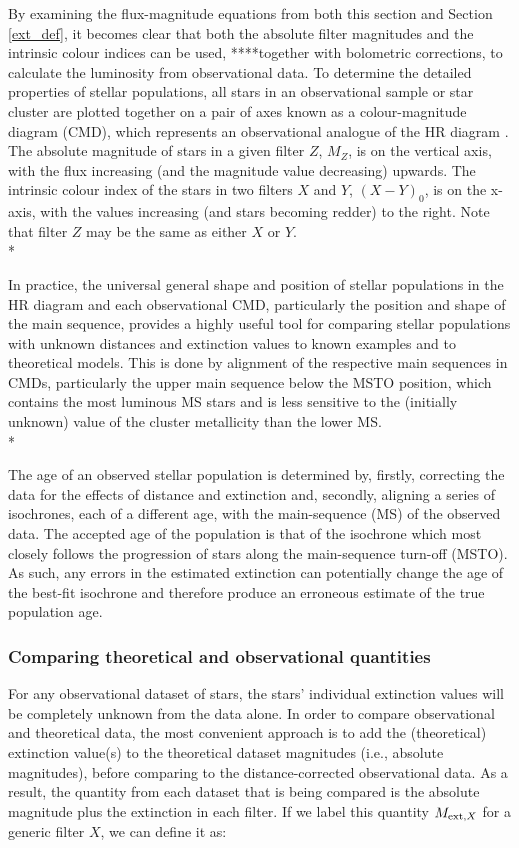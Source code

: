 \documentclass[12pt, a4paper]{report}
\begin{document}
By examining the flux-magnitude equations from both this section and Section \ref{ext_def}, it becomes clear that both the absolute filter magnitudes and the intrinsic colour indices can be used, ****together with bolometric corrections, to calculate the luminosity from observational data. To determine the detailed properties of stellar populations, all stars in an observational sample or star cluster are plotted together on a pair of axes known as a colour-magnitude diagram (CMD), which represents an observational analogue of the HR diagram \citep{2005ARA&A..43..293B}. The absolute magnitude of stars in a given filter $Z$, $M_{Z}$, is on the vertical axis, with the flux increasing (and the magnitude value decreasing) upwards. The intrinsic colour index of the stars in two filters $X$ and $Y$, $(X-Y)_{0}$, is on the x-axis, with the values increasing (and stars becoming redder) to the right. Note that filter $Z$ may be the same as either $X$ or $Y$.\\*

In practice, the universal general shape and position of stellar populations in the HR diagram and each observational CMD, particularly the position and shape of the main sequence, provides a highly useful tool for comparing stellar populations with unknown distances and extinction values to known examples and to theoretical models. This is done by alignment of the respective main sequences in CMDs, particularly the upper main sequence below the MSTO position, which contains the most luminous MS stars and is less sensitive to the (initially unknown) value of the cluster metallicity than the lower MS. \\*

The age of an observed stellar population is determined by, firstly, correcting the data for the effects of distance and extinction and, secondly, aligning a series of isochrones, each of a different age, with the main-sequence (MS) of the observed data. The accepted age of the population is that of the isochrone which most closely follows the progression of stars along the main-sequence turn-off (MSTO). As such, any errors in the estimated extinction can potentially change the age of the best-fit isochrone and therefore produce an erroneous estimate of the true population age.

\subsubsection{Comparing theoretical and observational quantities} \label{add_ext}
For any observational dataset of stars, the stars' individual extinction values will be completely unknown from the data alone. In order to compare observational and theoretical data, the most convenient approach is to add the (theoretical) extinction value(s) to the theoretical dataset magnitudes (i.e., absolute magnitudes), before comparing to the distance-corrected observational data. As a result, the quantity from each dataset that is being compared is the absolute magnitude plus the extinction in each filter. If we label this quantity $M_{\textnormal{ext},X}$ for a generic filter $X$, we can define it as:
\end{document}
